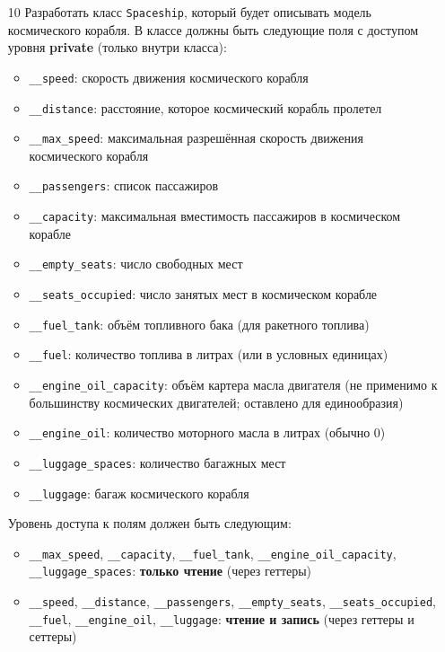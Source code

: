 \begin{enumerate}
\item[10] Разработать класс \texttt{Spaceship}, который будет описывать модель космического корабля. В классе должны быть следующие поля с доступом уровня \textbf{private} (только внутри класса):
\begin{itemize}
    \item \texttt{\_\_speed}: скорость движения космического корабля  
    \item \texttt{\_\_distance}: расстояние, которое космический корабль пролетел  
    \item \texttt{\_\_max\_speed}: максимальная разрешённая скорость движения космического корабля  
    \item \texttt{\_\_passengers}: список пассажиров  
    \item \texttt{\_\_capacity}: максимальная вместимость пассажиров в космическом корабле  
    \item \texttt{\_\_empty\_seats}: число свободных мест  
    \item \texttt{\_\_seats\_occupied}: число занятых мест в космическом корабле  
    \item \texttt{\_\_fuel\_tank}: объём топливного бака (для ракетного топлива)  
    \item \texttt{\_\_fuel}: количество топлива в литрах (или в условных единицах)  
    \item \texttt{\_\_engine\_oil\_capacity}: объём картера масла двигателя (не применимо к большинству космических двигателей; оставлено для единообразия)  
    \item \texttt{\_\_engine\_oil}: количество моторного масла в литрах (обычно 0)  
    \item \texttt{\_\_luggage\_spaces}: количество багажных мест  
    \item \texttt{\_\_luggage}: багаж космического корабля  
\end{itemize}
Уровень доступа к полям должен быть следующим:
\begin{itemize}
    \item \texttt{\_\_max\_speed}, \texttt{\_\_capacity}, \texttt{\_\_fuel\_tank}, \texttt{\_\_engine\_oil\_capacity}, \texttt{\_\_luggage\_spaces}: \textbf{только чтение} (через геттеры)  
    \item \texttt{\_\_speed}, \texttt{\_\_distance}, \texttt{\_\_passengers}, \texttt{\_\_empty\_seats}, \texttt{\_\_seats\_occupied}, \texttt{\_\_fuel}, \texttt{\_\_engine\_oil}, \texttt{\_\_luggage}: \textbf{чтение и запись} (через геттеры и сеттеры)
\end{itemize}

\end{enumerate}

